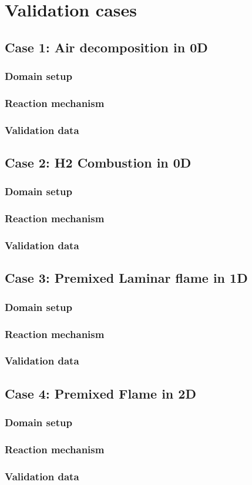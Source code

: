 \newpage
\chapter{Validation cases}

\section{Case 1: Air decomposition in 0D}
\subsection{Domain setup}
\subsection{Reaction mechanism}
\subsection{Validation data}

\section{Case 2: H2 Combustion in 0D}
\subsection{Domain setup}
\subsection{Reaction mechanism}
\subsection{Validation data}

\section{Case 3: Premixed Laminar flame in 1D}
\subsection{Domain setup}
\subsection{Reaction mechanism}
\subsection{Validation data}

\section{Case 4: Premixed Flame in 2D}
\subsection{Domain setup}
\subsection{Reaction mechanism}
\subsection{Validation data}